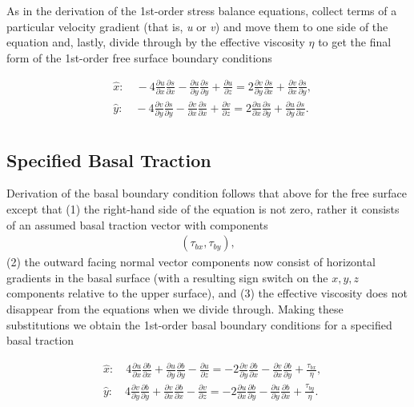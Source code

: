 As in the derivation of the 1st-order stress balance equations, collect terms of a particular velocity gradient (that is, \textit{u} or \textit{v}) and move them to one side of the equation and, lastly, divide through by the effective viscosity \textit{\(\eta{}\)} to get the final form of the 1st-order free surface boundary conditions

\begin{align*}
   {} & \hat{x}:\quad -4\frac{\partial u}{\partial x}\frac{\partial s}{\partial x}-\frac{\partial u}{\partial y}\frac{\partial s}{\partial y}+\frac{\partial u}{\partial z}=2\frac{\partial v}{\partial y}\frac{\partial s}{\partial x}+\frac{\partial v}{\partial x}\frac{\partial s}{\partial y},  \\
   {} & \hat{y}:\quad -4\frac{\partial v}{\partial y}\frac{\partial s}{\partial y}-\frac{\partial v}{\partial x}\frac{\partial s}{\partial x}+\frac{\partial v}{\partial z}=2\frac{\partial u}{\partial x}\frac{\partial s}{\partial y}+\frac{\partial u}{\partial y}\frac{\partial s}{\partial x}.  \\
\end{align*}

\subsection{Specified Basal Traction}
Derivation of the basal boundary condition follows that above for the free surface except that (1) the right-hand side of the equation is not zero, rather it consists of an assumed basal traction vector with components 
\begin{align*}
\left( \tau _{bx},\tau _{by} \right),
\end{align*}
(2) the outward facing normal vector components now consist of horizontal gradients in the basal surface (with a resulting sign switch on the $x,y,z$ components relative to the upper surface), and (3) the effective viscosity does not disappear from the equations when we divide through. Making these substitutions we obtain the 1st-order basal boundary conditions for a specified basal traction

\begin{align*}
  & \hat{x}:\quad 4\frac{\partial u}{\partial x}\frac{\partial b}{\partial x}+\frac{\partial u}{\partial y}\frac{\partial b}{\partial y}-\frac{\partial u}{\partial z}=-2\frac{\partial v}{\partial y}\frac{\partial b}{\partial x}-\frac{\partial v}{\partial x}\frac{\partial b}{\partial y}+\frac{\tau _{bx}}{\eta }, \\ 
 & \hat{y}:\quad 4\frac{\partial v}{\partial y}\frac{\partial b}{\partial y}+\frac{\partial v}{\partial x}\frac{\partial b}{\partial x}-\frac{\partial v}{\partial z}=-2\frac{\partial u}{\partial x}\frac{\partial b}{\partial y}-\frac{\partial u}{\partial y}\frac{\partial b}{\partial x}+\frac{\tau _{by}}{\eta }. \\
 \end{align*}

